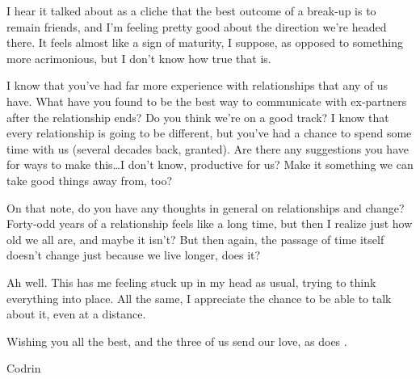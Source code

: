 I hear it talked about as a cliche that the best outcome of a break-up is to remain friends, and I'm feeling pretty good about the direction we're headed there. It feels almost like a sign of maturity, I suppose, as opposed to something more acrimonious, but I don't know how true that is.

I know that you've had far more experience with relationships that any of us have. What have you found to be the best way to communicate with ex-partners after the relationship ends? Do you think we're on a good track? I know that every relationship is going to be different, but you've had a chance to spend some time with us (several decades back, granted). Are there any suggestions you have for ways to make this\ldots I don't know, productive for us? Make it something we can take good things away from, too?

On that note, do you have any thoughts in general on relationships and change? Forty-odd years of a relationship feels like a long time, but then I realize just how old we all are, and maybe it isn't? But then again, the passage of time itself doesn't change just because we live longer, does it?

Ah well. This has me feeling stuck up in my head as usual, trying to think everything into place. All the same, I appreciate the chance to be able to talk about it, even at a distance.

Wishing you all the best, and the three of us send our love, as does \Partner .

Codrin
